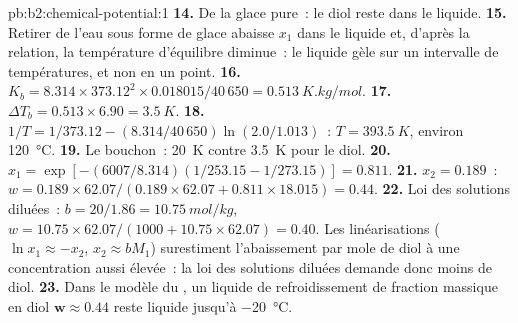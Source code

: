 \begin{solution}{pb:b2:chemical-potential:1}
\textbf{14.} De la glace pure~: le diol reste dans le liquide.
\textbf{15.} Retirer de l'eau sous forme de glace abaisse $x_1$ dans le liquide et, d'après la
relation, la température d'équilibre diminue~: le liquide gèle sur un intervalle
de températures, et non en un point.
\textbf{16.} $K_b = 8.314 \times 373.12^2 \times 0.018015/40\,650 =
\qty{0.513}{K.kg/mol}$.
\textbf{17.} $\Delta T_b = 0.513 \times 6.90 = \qty{3.5}{K}$.
\textbf{18.} $1/T = 1/373.12 - (8.314/40\,650)\ln(2.0/1.013)$~: $T = \qty{393.5}{K}$,
environ \qty{120}{\celsius}.
\textbf{19.} Le bouchon~: \qty{20}{K} contre \qty{3.5}{K} pour le diol.
\textbf{20.} $x_1 = \exp[-(6007/8.314)(1/253.15 - 1/273.15)] = 0.811$.
\textbf{21.} $x_2 = 0.189$~: $w = 0.189 \times 62.07/(0.189 \times 62.07 + 0.811
\times 18.015) = 0.44$.
\textbf{22.} Loi des solutions diluées~: $b = 20/1.86 = \qty{10.75}{mol/kg}$, $w = 10.75 \times
62.07/(1000 + 10.75 \times 62.07) = 0.40$. Les linéarisations ($\ln x_1 \approx
-x_2$, $x_2 \approx bM_1$) surestiment l'abaissement par mole de diol à une concentration
aussi élevée~: la loi des solutions diluées demande donc moins de diol.
\textbf{23.} Dans le modèle du , un liquide de refroidissement de fraction massique en
diol $\boldsymbol{w \approx 0.44}$ reste liquide jusqu'à \qty{-20}{\celsius}.
\end{solution}
